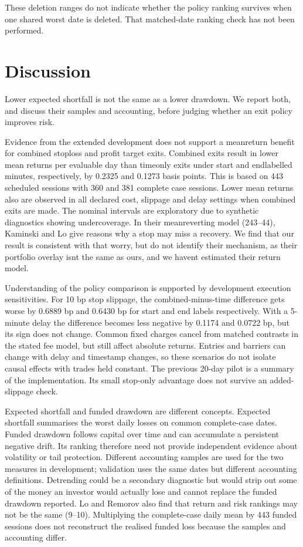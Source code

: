 \documentclass[11pt,a4paper]{article}
\begin{document}
These deletion ranges do not indicate whether the policy ranking survives when one shared worst date is deleted. That matched-date ranking check has not been performed.

\section*{Discussion}

Lower expected shortfall is not the same as a lower drawdown. We report both, and discuss their samples and accounting, before judging whether an exit policy improves risk.

Evidence from the extended development does not support a mean\allowbreak{}return benefit for combined stop\allowbreak{}loss and profit target exits. Combined exits result in lower mean returns per evaluable day than time\allowbreak{}only exits under start\allowbreak{} and end\allowbreak{}labelled minutes, respectively, by 0.2325 and 0.1273 basis points. This is based on 443 scheduled sessions with 360 and 381 complete case sessions. Lower mean returns also are observed in all declared cost, slippage and delay settings when combined exits are made. The nominal intervals are exploratory due to synthetic diagnostics showing undercoverage. In their mean\allowbreak{}reverting model (243–44), Kaminski and Lo give reasons why a stop may miss a recovery. We find that our result is consistent with that worry, but do not identify their mechanism, as their portfolio overlay isnt the same as ours, and we havent estimated their return model.

Understanding of the policy comparison is supported by development execution sensitivities. For 10 bp stop slippage, the combined-minus-time difference gets worse by 0.6889 bp and 0.6430 bp for start and end labels respectively. With a 5-minute delay the difference becomes less negative by 0.1174 and 0.0722 bp, but its sign does not change. Common fixed charges cancel from matched contrasts in the stated fee model, but still affect absolute returns. Entries and barriers can change with delay and timestamp changes, so these scenarios do not isolate causal effects with trades held constant. The previous 20-day pilot is a summary of the implementation. Its small stop-only advantage does not survive an added-slippage check.

Expected shortfall and funded drawdown are different concepts. Expected shortfall summarises the worst daily losses on common complete-case dates. Funded drawdown follows capital over time and can accumulate a persistent negative drift. Its ranking therefore need not provide independent evidence about volatility or tail protection. Different accounting samples are used for the two measures in development; validation uses the same dates but different accounting definitions. Detrending could be a secondary diagnostic but would strip out some of the money an investor would actually lose and cannot replace the funded drawdown reported. Lo and Remorov also find that return and risk rankings may not be the same (9--10). Multiplying the complete-case daily mean by 443 funded sessions does not reconstruct the realised funded loss because the samples and accounting differ.
\end{document}
